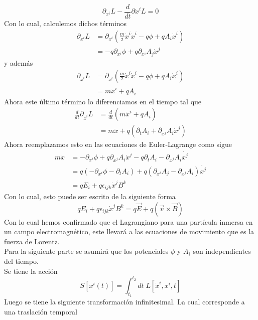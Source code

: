 \documentclass[../main_ej.tex]{subfiles}
\begin{document}
\begin{equation}
  \partial_{x^i} L  - \frac{d}{dt}\partial{\dot{x}^i}L = 0
\end{equation}
Con lo cual, calculemos dichos términos
\begin{align*}
  \partial_{x^i} L & = \partial_{x^i} \left( \frac{m}{2}\dot{x}^i\dot{x}^i - q\phi + qA_i\dot{x}^i  \right) \\
  & = -q\partial_{x^i}\phi + q\partial_{x^i}A_j\dot{x}^j
\end{align*}
y además
\begin{align*}
  \partial_{\dot{x}^i}L & = \partial_{\dot{x}^i} \left( \frac{m}{2}\dot{x}^i\dot{x}^i - q\phi + qA_i\dot{x}^i \right) \\
  & = m\dot{x}^i + qA_i
\end{align*}
Ahora este último término lo diferenciamos en el tiempo tal que 
\begin{align*}
  \frac{d}{dt}\partial_{\dot{x}^i} L & = \frac{d}{dt}\left( m\dot{x}^i + qA_i \right) \\
  & = m\ddot{x} + q\left( \partial_{t}A_i + \partial_{x^j}A_i\dot{x}^j  \right)
\end{align*}
Ahora reemplazamos esto en las ecuaciones de Euler-Lagrange como sigue
\begin{align*}
  m\ddot{x} & = -\partial_{x^i}\phi + q\partial_{x^j}A_i\dot{x}^j - q\partial_{t}A_i - \partial_{x^j}A_i\dot{x^j} \\
  & = q\left( -\partial_{x^i}\phi - \partial_{t}A_i \right) + q\left( \partial_{x^i}A_j - \partial_{x^j}A_i \right)\dot{x^j} \\
  & = qE_i + q\epsilon_{ijk}\dot{x}^jB^k
\end{align*}
Con lo cual, esto puede ser escrito de la siguiente forma
\begin{equation}
  qE_i + q\epsilon_{ijk}\dot{x}^jB^k = q\vec{E} + q(\vec{v}\times\vec{B})
\end{equation}
Con lo cual hemos confirmado que el Lagrangiano para una partícula inmersa en un campo electromagnético, este llevará a las ecuaciones de movimiento que es la fuerza de Lorentz.\\
Para la siguiente parte se asumirá que los potenciales $\phi$ y $A_i$ son independientes del tiempo. \\
Se tiene la acción
\begin{equation}
  S[x^i(t)] = \int_{t_1}^{t_2} dt \; L[\dot{x}^i,x^i,t]
\end{equation}
Luego se tiene la siguiente transformación infinitesimal. La cual corresponde a una traslación temporal
\end{document}
